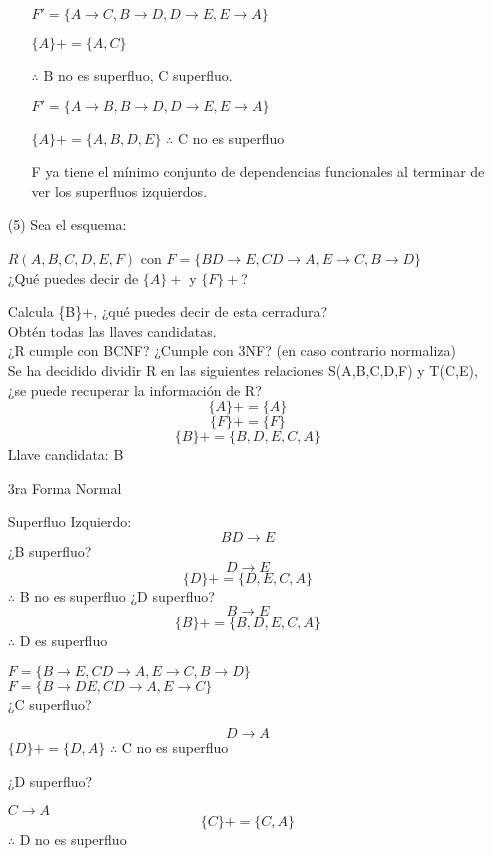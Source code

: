 \documentclass{article}
\begin{document}
\begin{enumerate}
\begin{enumerate}
      $F'=\{A \rightarrow C, B \rightarrow D, D\rightarrow E, E\rightarrow A\}$

      $\{A\}+=\{A,C\}$

      $\therefore$ B no es superfluo, C superfluo.

      $F'=\{A \rightarrow B, B \rightarrow D, D\rightarrow E, E \rightarrow A\}$

      $\{A\}+=\{A,B,D,E\}$
      $\therefore$ C no es superfluo

      F ya tiene el mínimo conjunto de dependencias funcionales al terminar de
      ver los superfluos izquierdos.
    \end{enumerate}

    \item[(5)] Sea el esquema:

    $R(A,B,C,D,E,F)$ con $F=\{BD \rightarrow E, CD \rightarrow A, E \rightarrow C, B \rightarrow D\}$\\
    ¿Qué puedes decir de $\{A\}+$ y $\{F\}+$?

    Calcula \{B\}+, ¿qué puedes decir de esta cerradura?\\
    Obtén todas las llaves candidatas.\\
    ¿R cumple con BCNF? ¿Cumple con 3NF? (en caso contrario normaliza)\\
    Se ha decidido dividir R en las siguientes relaciones S(A,B,C,D,F) y T(C,E), ¿se puede recuperar la
    información de R?
    $$\{ A\}+=\{ A\}$$
    $$\{ F\}+=\{ F\}$$
    $$\{ B\}+=\{ B,D,E,C,A\}$$
    Llave candidata: B

    3ra Forma Normal

    Superfluo Izquierdo:
    $$BD \rightarrow E$$
    ¿B superfluo?
    $$D\rightarrow E$$
    $$\{ D\}+=\{ D,E,C,A\}$$
    $\therefore$ B no es superfluo
    ¿D superfluo?
    $$B\rightarrow E$$
    $$\{ B\}+=\{ B,D,E,C,A\}$$
    $\therefore$ D es superfluo

    $F=\{B \rightarrow E, CD \rightarrow A, E \rightarrow C, B\rightarrow D\}$\\
    $F=\{B \rightarrow DE, CD \rightarrow A, E \rightarrow C\}$\\

    ¿C superfluo?

    $$D\rightarrow A$$
    $\{ D\}+=\{ D,A\}$
    $\therefore$ C no es superfluo

    ¿D superfluo?

    $C \rightarrow A$
    $$\{ C\}+=\{ C,A\}$$
    $\therefore$ D no es superfluo


\end{enumerate}
\end{document}
